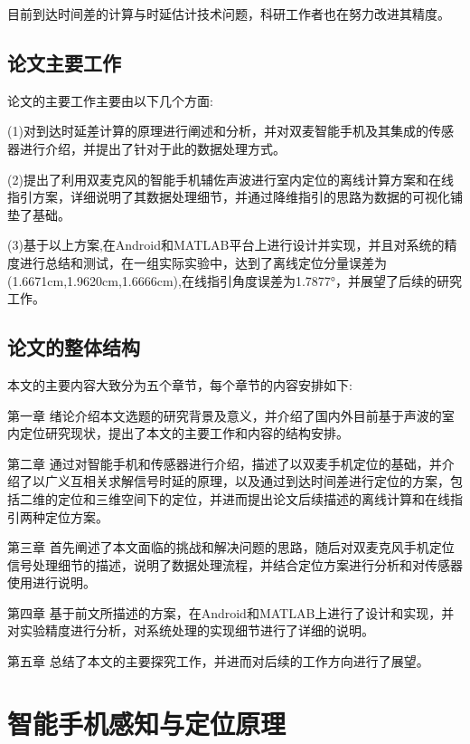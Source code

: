 \documentclass[winfonts,oneside]{njuthesis}
\begin{document}
		目前到达时间差的计算与时延估计技术问题\cite{cuiweiwei}，科研工作者也在努力改进其精度。

	\section{论文主要工作}

		论文的主要工作主要由以下几个方面:
		
		(1)对到达时延差计算的原理进行阐述和分析，并对双麦智能手机及其集成的传感器进行介绍，并提出了针对于此的数据处理方式。

		(2)提出了利用双麦克风的智能手机辅佐声波进行室内定位的离线计算方案和在线指引方案，详细说明了其数据处理细节，并通过降维指引的思路为数据的可视化铺垫了基础。

		(3)基于以上方案,在Android和MATLAB平台上进行设计并实现，并且对系统的精度进行总结和测试，在一组实际实验中，达到了离线定位分量误差为(1.6671cm,1.9620cm,1.6666cm),在线指引角度误差为1.7877°，并展望了后续的研究工作。

	\section{论文的整体结构}
		本文的主要内容大致分为五个章节，每个章节的内容安排如下:
		
		第一章 绪论介绍本文选题的研究背景及意义，并介绍了国内外目前基于声波的室内定位研究现状，提出了本文的主要工作和内容的结构安排。
		 
		第二章 通过对智能手机和传感器进行介绍，描述了以双麦手机定位的基础，并介绍了以广义互相关求解信号时延的原理，以及通过到达时间差进行定位的方案，包括二维的定位和三维空间下的定位，并进而提出论文后续描述的离线计算和在线指引两种定位方案。
		
		第三章 首先阐述了本文面临的挑战和解决问题的思路，随后对双麦克风手机定位信号处理细节的描述，说明了数据处理流程，并结合定位方案进行分析和对传感器使用进行说明。
		
		第四章 基于前文所描述的方案，在Android和MATLAB上进行了设计和实现，并对实验精度进行分析，对系统处理的实现细节进行了详细的说明。
		
		第五章 总结了本文的主要探究工作，并进而对后续的工作方向进行了展望。
		
\chapter{智能手机感知与定位原理}\label{chapter_mobile}
	
\end{document}
